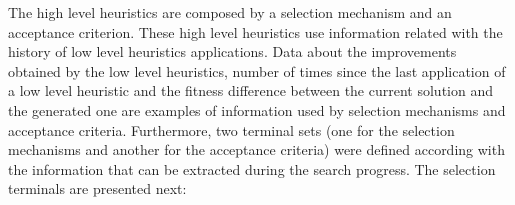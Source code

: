 \documentclass[conference]{IEEEtran}
\begin{document}







 The high level heuristics are composed by a selection mechanism and an acceptance criterion. These high level heuristics use information related with the history of low level heuristics applications. Data about the improvements obtained by the low level heuristics, number of times since the last application of a low level heuristic and the fitness difference between the current solution and the generated one are examples of information used by selection mechanisms and acceptance criteria.  Furthermore, two terminal sets (one for the selection mechanisms and another for the acceptance criteria) were defined according with the information that can be extracted during the search progress. The selection terminals are presented next:

\end{document}
